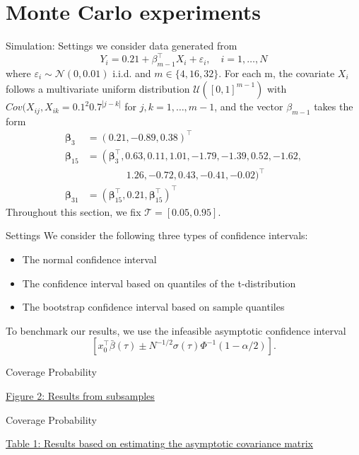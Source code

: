 \documentclass[11pt]{beamer}
\begin{document}
\section{Monte Carlo experiments}
\begin{frame}{Simulation: Settings}
we consider data generated from
$$
Y_{i}=0.21+\beta_{m-1}^{\top} X_{i}+\varepsilon_{i}, \quad i=1, \ldots, N
$$
where $\varepsilon_i\sim \mathcal{N}(0,0.01)$ i.i.d. and $m \in \{4,16,32\}$. For each m, the covariate $X_i$  follows a multivariate uniform distribution $\mathcal{U}\left([0,1]^{m-1}\right)$ with $Cov(X_{ij},X_{ik}=0.1^2 0.7^{|j-k|}$ for $j,k=1,\dots,m-1$, and the vector $\beta_{m-1}$ takes the form
$$
\begin{aligned}
\boldsymbol{\beta}_{3}&=(0.21,-0.89,0.38)^{\top}\\
\boldsymbol{\beta}_{15} &=\left(\boldsymbol{\beta}_{3}^{\top}, 0.63,0.11,1.01,-1.79,-1.39,  0.52,-1.62,\right. \\
&\qquad\qquad 1.26,-0.72,0.43,-0.41,-0.02)^{\top}\\
\boldsymbol{\beta}_{31}&=\left(\boldsymbol{\beta}_{15}^{\top}, 0.21, \boldsymbol{\beta}_{15}^{\top}\right)^{\top}
\end{aligned}
$$
Throughout this section, we fix $\mathcal{T}=[0.05,0.95]$.
\end{frame}
\begin{frame}{Settings}
We consider the following three types of confidence intervals:
\begin{itemize}
\item The normal confidence interval
\item The confidence interval based on quantiles of the t-distribution
\item The bootstrap confidence interval based on sample quantiles
\end{itemize}
To benchmark our results, we use the infeasible asymptotic confidence interval
$$
\left[x_{0}^{\top} \bar{\beta}(\tau) \pm N^{-1 / 2} \sigma(\tau) \Phi^{-1}(1-\alpha / 2)\right].
$$
\end{frame}
\begin{frame}{Coverage Probability}
\begin{center}
\href{fig2.png}{\color{blue} Figure 2: Results from subsamples}
\end{center}
\end{frame}

\begin{frame}{Coverage Probability}
\begin{center}
\href{table1.png}{\color{blue} Table 1: Results based on estimating the asymptotic covariance matrix }
\end{center}
\end{frame}
\end{document}
